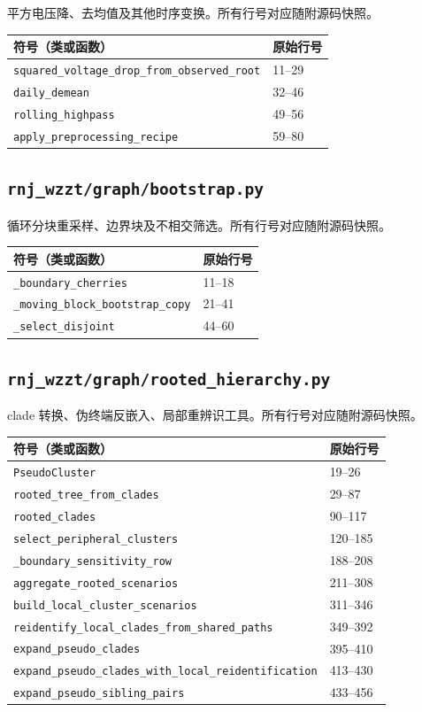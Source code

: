 平方电压降、去均值及其他时序变换。所有行号对应随附源码快照。
\begin{longtable}{P{0.73\textwidth}P{0.18\textwidth}}\toprule 符号（类或函数） & 原始行号\\\midrule\endhead
\nolinkurl{squared_voltage_drop_from_observed_root} & 11--29 \\
\nolinkurl{daily_demean} & 32--46 \\
\nolinkurl{rolling_highpass} & 49--56 \\
\nolinkurl{apply_preprocessing_recipe} & 59--80 \\
\bottomrule\end{longtable}
\subsection{\texorpdfstring{\nolinkurl{rnj_wzzt/graph/bootstrap.py}}{rnj\_wzzt/graph/bootstrap.py}}\label{module:graph.bootstrap}
循环分块重采样、边界块及不相交筛选。所有行号对应随附源码快照。
\begin{longtable}{P{0.73\textwidth}P{0.18\textwidth}}\toprule 符号（类或函数） & 原始行号\\\midrule\endhead
\nolinkurl{_boundary_cherries} & 11--18 \\
\nolinkurl{_moving_block_bootstrap_copy} & 21--41 \\
\nolinkurl{_select_disjoint} & 44--60 \\
\bottomrule\end{longtable}
\subsection{\texorpdfstring{\nolinkurl{rnj_wzzt/graph/rooted_hierarchy.py}}{rnj\_wzzt/graph/rooted\_hierarchy.py}}\label{module:graph.rooted_hierarchy}
clade 转换、伪终端反嵌入、局部重辨识工具。所有行号对应随附源码快照。
\begin{longtable}{P{0.73\textwidth}P{0.18\textwidth}}\toprule 符号（类或函数） & 原始行号\\\midrule\endhead
\nolinkurl{PseudoCluster} & 19--26 \\
\nolinkurl{rooted_tree_from_clades} & 29--87 \\
\nolinkurl{rooted_clades} & 90--117 \\
\nolinkurl{select_peripheral_clusters} & 120--185 \\
\nolinkurl{_boundary_sensitivity_row} & 188--208 \\
\nolinkurl{aggregate_rooted_scenarios} & 211--308 \\
\nolinkurl{build_local_cluster_scenarios} & 311--346 \\
\nolinkurl{reidentify_local_clades_from_shared_paths} & 349--392 \\
\nolinkurl{expand_pseudo_clades} & 395--410 \\
\nolinkurl{expand_pseudo_clades_with_local_reidentification} & 413--430 \\
\nolinkurl{expand_pseudo_sibling_pairs} & 433--456 \\
\bottomrule\end{longtable}
